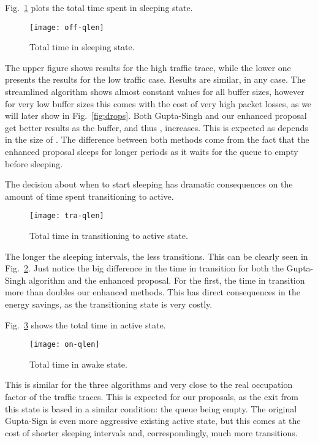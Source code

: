 \documentclass[conference,english]{IEEEtran}
\begin{document}
Fig.~\ref{fig:off-time} plots the total time spent in sleeping state.
\begin{figure}
  \centering
  \texttt{[image: off-qlen]}
  \caption{Total time in sleeping state.}
  \label{fig:off-time}
\end{figure}
The upper figure shows results for the high traffic trace, while the lower one
presents the results for the low traffic case. Results are similar, in any
case. The streamlined algorithm shows almost constant values for all buffer
sizes, however for very low buffer sizes this comes with the cost of very high
packet losses, as we will later show in Fig.~\ref{fig:drops}. Both Gupta-Singh
and our enhanced proposal get better results as the buffer, and thus ,
increases. This is expected as  depends in the size of . The
difference between both methods come from the fact that the enhanced proposal
sleeps for longer periods as it waits for the queue to empty before sleeping.

The decision about when to start sleeping has dramatic consequences on the
amount of time spent transitioning to active.
\begin{figure}
  \centering
  \texttt{[image: tra-qlen]}
  \caption{Total time in transitioning to active state.}
  \label{fig:tra-time}
\end{figure}
The longer the sleeping intervals, the less transitions. This can be clearly
seen in Fig.~\ref{fig:tra-time}. Just notice the big difference in the time in
transition for both the Gupta-Singh algorithm and the enhanced proposal. For
the first, the time in transition more than doubles our enhanced methods. This
has direct consequences in the energy savings, as the transitioning state is
very costly.

Fig.~\ref{fig:on-time} shows the total time in active state.
\begin{figure}
  \centering
  \texttt{[image: on-qlen]}
  \caption{Total time in awake state.}
  \label{fig:on-time}
\end{figure}
This is similar for the three algorithms and very close to the real occupation
factor of the traffic traces. This is expected for our proposals, as the exit
from this state is based in a similar condition: the queue being empty. The
original Gupta-Sign is even more aggressive existing active state, but this
comes at the cost of shorter sleeping intervals and, correspondingly, much
more transitions.
\end{document}
